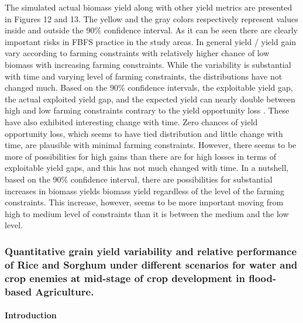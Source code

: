 \documentclass[11pt,preprint]{article}
\begin{document}
The simulated actual biomass yield along with other yield metrics are
presented in Figures 12 and 13. The yellow and the gray colors
respectively represent values inside and outside the 90\% confidence
interval. As it can be seen there are clearly important risks in FBFS
practice in the study areas. In general yield / yield gain vary
according to farming constraints with relatively higher chance of low
biomass with increasing farming constraints. While the variability is
substantial with time and varying level of farming constraints, the
distributions have not changed much. Based on the 90\% confidence
intervals, the exploitable yield gap, the actual exploited yield gap,
and the expected yield can nearly double between high and low farming
constraints contrary to the yield opportunity loss . These have also
exhibited interesting change with time. Zero chances of yield
opportunity loss, which seems to have tied distribution and little
change with time, are plausible with minimal farming constraints.
However, there seems to be more of possibilities for high gains than
there are for high losses in terms of exploitable yield gaps, and this
has not much changed with time. In a nutshell, based on the 90\%
confidence interval, there are possibilities for substantial increases
in biomass yields biomass yield regardless of the level of the farming
constraints. This increase, however, seems to be more important moving
from high to medium level of constraints than it is between the medium
and the low level.

\hypertarget{quantitative-grain-yield-variability-and-relative-performance-of-rice-and-sorghum-under-different-scenarios-for-water-and-crop-enemies-at-mid-stage-of-crop-development-in-flood-based-agriculture.}{%
\subsubsection{Quantitative grain yield variability and relative
performance of Rice and Sorghum under different scenarios for water and
crop enemies at mid-stage of crop development in flood-based
Agriculture.}\label{quantitative-grain-yield-variability-and-relative-performance-of-rice-and-sorghum-under-different-scenarios-for-water-and-crop-enemies-at-mid-stage-of-crop-development-in-flood-based-agriculture.}}

\hypertarget{introduction-3}{%
\paragraph{Introduction}\label{introduction-3}}
\end{document}

